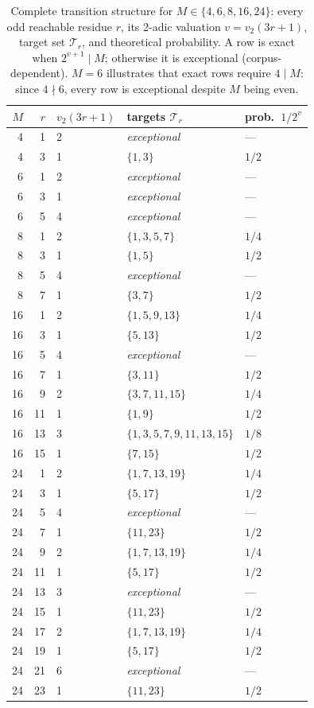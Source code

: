 \documentclass[12pt,a4paper]{article}
\begin{document}
\begin{table}[p]
\centering
\caption{Complete transition structure for $M \in \{4,6,8,16,24\}$:
every odd reachable residue $r$, its 2-adic valuation $v = v_2(3r+1)$, target
set $\mathcal{T}_r$, and theoretical probability.  A row is exact when
$2^{v+1} \mid M$; otherwise it is exceptional (corpus-dependent).
$M=6$ illustrates that exact rows require $4 \mid M$: since $4 \nmid 6$,
every row is exceptional despite $M$ being even.}
\label{tab:chisq}
\begin{tabular}{rrlll}
\toprule
$M$ & $r$ & $v_2(3r+1)$ & targets $\mathcal{T}_r$ & prob.\ $1/2^v$ \\
\midrule
4 & 1 & 2 & \emph{exceptional} & --- \\
4 & 3 & 1 & $\{1,3\}$ & $1/2$ \\
\midrule
6 & 1 & 2 & \emph{exceptional} & --- \\
6 & 3 & 1 & \emph{exceptional} & --- \\
6 & 5 & 4 & \emph{exceptional} & --- \\
\midrule
8 & 1 & 2 & $\{1,3,5,7\}$ & $1/4$ \\
8 & 3 & 1 & $\{1,5\}$ & $1/2$ \\
8 & 5 & 4 & \emph{exceptional} & --- \\
8 & 7 & 1 & $\{3,7\}$ & $1/2$ \\
\midrule
16 & 1  & 2 & $\{1,5,9,13\}$ & $1/4$ \\
16 & 3  & 1 & $\{5,13\}$ & $1/2$ \\
16 & 5  & 4 & \emph{exceptional} & --- \\
16 & 7  & 1 & $\{3,11\}$ & $1/2$ \\
16 & 9  & 2 & $\{3,7,11,15\}$ & $1/4$ \\
16 & 11 & 1 & $\{1,9\}$ & $1/2$ \\
16 & 13 & 3 & $\{1,3,5,7,9,11,13,15\}$ & $1/8$ \\
16 & 15 & 1 & $\{7,15\}$ & $1/2$ \\
\midrule
24 & 1  & 2 & $\{1,7,13,19\}$ & $1/4$ \\
24 & 3  & 1 & $\{5,17\}$ & $1/2$ \\
24 & 5  & 4 & \emph{exceptional} & --- \\
24 & 7  & 1 & $\{11,23\}$ & $1/2$ \\
24 & 9  & 2 & $\{1,7,13,19\}$ & $1/4$ \\
24 & 11 & 1 & $\{5,17\}$ & $1/2$ \\
24 & 13 & 3 & \emph{exceptional} & --- \\
24 & 15 & 1 & $\{11,23\}$ & $1/2$ \\
24 & 17 & 2 & $\{1,7,13,19\}$ & $1/4$ \\
24 & 19 & 1 & $\{5,17\}$ & $1/2$ \\
24 & 21 & 6 & \emph{exceptional} & --- \\
24 & 23 & 1 & $\{11,23\}$ & $1/2$ \\
\bottomrule
\end{tabular}
\end{table}
\end{document}
